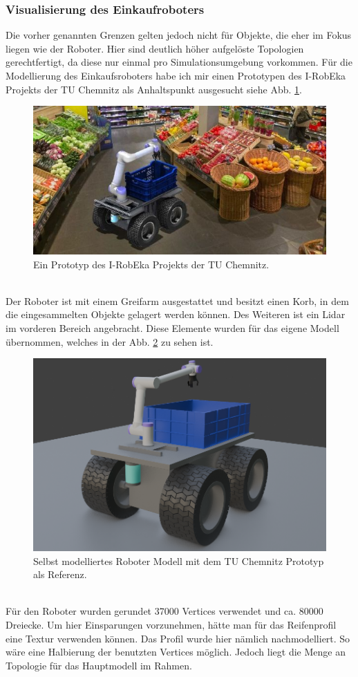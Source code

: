 \subsubsection{Visualisierung des Einkaufroboters}
\label{vis_agent}
Die vorher genannten Grenzen gelten jedoch nicht für Objekte, die eher im Fokus liegen wie der Roboter. Hier sind deutlich höher aufgelöste Topologien gerechtfertigt, da diese nur einmal pro Simulationsumgebung vorkommen. Für die Modellierung des Einkaufsroboters habe ich mir einen Prototypen des I-RobEka Projekts der TU Chemnitz als Anhaltspunkt ausgesucht siehe Abb. \ref{fig:robeka}.
\begin{figure} [ht]
	\centering
	\includegraphics[width=0.8\columnwidth]{img/robeka}
	\caption[Ein Protoyp eines mobilen Roboters der TU Chemnitz]{Ein Prototyp des I-RobEka Projekts der TU Chemnitz\cite{robeka}.}
	\label{fig:robeka}
\end{figure}
\\
Der Roboter ist mit einem Greifarm ausgestattet und besitzt einen Korb, in dem die eingesammelten Objekte gelagert werden können. Des Weiteren ist ein Lidar im vorderen Bereich angebracht. Diese Elemente wurden für das eigene Modell übernommen, welches in der Abb. \ref{fig:robo} zu sehen ist. 
\begin{figure} [ht]
	\centering
	\includegraphics[width=0.75\columnwidth]{img/robo}
	\caption[Eigenes Roboter Modell]{Selbst modelliertes Roboter Modell mit dem TU Chemnitz Prototyp als Referenz.}
	\label{fig:robo}
\end{figure}
\\
Für den Roboter wurden gerundet 37000 Vertices verwendet und ca. 80000 Dreiecke. Um hier Einsparungen vorzunehmen, hätte man für das Reifenprofil eine Textur verwenden können. Das Profil wurde hier nämlich nachmodelliert. So wäre eine Halbierung der benutzten Vertices möglich. Jedoch liegt die Menge an Topologie für das Hauptmodell im Rahmen. 
